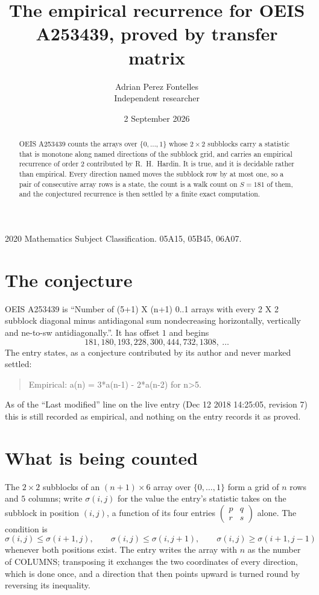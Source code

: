 \documentclass[11pt,a4paper]{article}
\title{The empirical recurrence for OEIS A253439, proved by transfer matrix}
\author{Adrian Perez Fontelles\\ \small Independent researcher}
\date{2 September 2026}
\theoremstyle{plain}
\theoremstyle{definition}
\begin{document}
\maketitle

\begin{abstract}
OEIS A253439 counts the arrays over $\{0,\dots,1\}$ whose $2\times2$ subblocks carry a
statistic that is monotone along named directions of the subblock grid, and carries an
empirical recurrence of order $2$ contributed by R.~H.~Hardin. It is true, and it is
decidable rather than empirical. Every direction named moves the subblock row by at most one,
so a pair of consecutive array rows is a state, the count is a walk count on $S=181$ of them,
and the conjectured recurrence is then settled by a finite exact computation.
\end{abstract}

\noindent\small 2020 Mathematics Subject Classification. 05A15, 05B45, 06A07.\normalsize

\section{The conjecture}

OEIS A253439 is ``Number of (5+1) X (n+1) 0..1 arrays with every 2 X 2 subblock diagonal minus antidiagonal sum nondecreasing horizontally, vertically and ne-to-sw antidiagonally.''. It has offset $1$ and begins
\[
181, 180, 193, 228, 300, 444, 732, 1308,\ \dots
\]
The entry states, as a conjecture contributed by its author and never marked settled:
\begin{quote}
Empirical: a(n) = 3*a(n-1) - 2*a(n-2) for n>5.
\end{quote}
As of the ``Last modified'' line on the live entry (Dec 12 2018 14:25:05, revision 7) this is still
recorded as empirical, and nothing on the entry records it as proved.

\section{What is being counted}

The $2\times2$ subblocks of an $(n+1)\times6$ array over $\{0,\dots,1\}$ form a grid
of $n$ rows and $5$ columns; write $\sigma(i,j)$ for the value the entry's statistic takes on
the subblock in position $(i,j)$, a function of its four entries
$\begin{pmatrix}p&q\\r&s\end{pmatrix}$ alone. The condition is
\[
\sigma(i,j)\le\sigma(i+1,j),\qquad \sigma(i,j)\le\sigma(i,j+1),\qquad \sigma(i,j)\ge\sigma(i+1,j-1)
\]
whenever both positions exist. The entry writes the array with $n$ as the number of COLUMNS; transposing it exchanges the two coordinates of every direction, which is done once, and a direction that then points upward is turned round by reversing its inequality.
\end{document}
